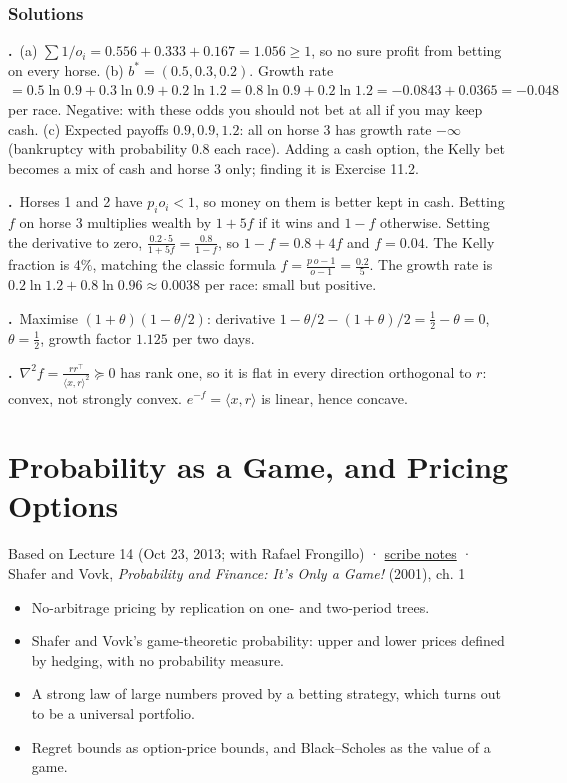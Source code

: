 \documentclass[11pt,a4paper,openany]{book}
\newcommand{\ip}[2]{\langle #1,#2\rangle}
\newcommand{\chapsource}[1]{{\small\sffamily\color{muted}#1\par}\medskip}
\newenvironment{solutions}{\small}{}
\newcommand{\sol}[2]{\par\smallskip\noindent\textbf{\sffamily #1.}\ #2\par}
\begin{document}
\subsection*{Solutions}
\begin{solutions}
\sol{11.1}{(a) $\sum1/o_i=0.556+0.333+0.167=1.056\ge1$, so no sure profit from betting on every horse. (b) $b^*=(0.5,0.3,0.2)$. Growth rate $=0.5\ln0.9+0.3\ln0.9+0.2\ln1.2=0.8\ln0.9+0.2\ln1.2=-0.0843+0.0365=-0.048$ per race. Negative: with these odds you should not bet at all if you may keep cash. (c) Expected payoffs $0.9,0.9,1.2$: all on horse 3 has growth rate $-\infty$ (bankruptcy with probability $0.8$ each race). Adding a cash option, the Kelly bet becomes a mix of cash and horse 3 only; finding it is Exercise 11.2.}
\sol{11.2}{Horses 1 and 2 have $p_io_i<1$, so money on them is better kept in cash. Betting $f$ on horse 3 multiplies wealth by $1+5f$ if it wins and $1-f$ otherwise. Setting the derivative to zero, $\frac{0.2\cdot5}{1+5f}=\frac{0.8}{1-f}$, so $1-f=0.8+4f$ and $f=0.04$. The Kelly fraction is $4\%$, matching the classic formula $f=\frac{p\,o-1}{o-1}=\frac{0.2}{5}$. The growth rate is $0.2\ln1.2+0.8\ln0.96\approx0.0038$ per race: small but positive.}
\sol{11.3}{Maximise $(1+\theta)(1-\theta/2)$: derivative $1-\theta/2-(1+\theta)/2=\frac12-\theta=0$, $\theta=\frac12$, growth factor $1.125$ per two days.}
\sol{11.4}{$\nabla^2f=\frac{rr^\top}{\ip{x}{r}^2}\succeq0$ has rank one, so it is flat in every direction orthogonal to $r$: convex, not strongly convex. $e^{-f}=\ip xr$ is linear, hence concave.}
\end{solutions}

\chapter[Probability as a game, options]{Probability as a Game, and Pricing Options}\label{ch12}
\chapsource{Based on Lecture 14 (Oct 23, 2013; with Rafael Frongillo) · \href{https://web.eecs.umich.edu/~jabernet/eecs598course/fall2013/web/notes/lec14_102313.pdf}{scribe notes} · Shafer and Vovk, \emph{Probability and Finance: It's Only a Game!} (2001), ch. 1}

\begin{goals}
\begin{itemize}
\item No-arbitrage pricing by replication on one- and two-period trees.
\item Shafer and Vovk's game-theoretic probability: upper and lower prices defined by hedging, with no probability measure.
\item A strong law of large numbers proved by a betting strategy, which turns out to be a universal portfolio.
\item Regret bounds as option-price bounds, and Black–Scholes as the value of a game.
\end{itemize}
\end{goals}
\end{document}
